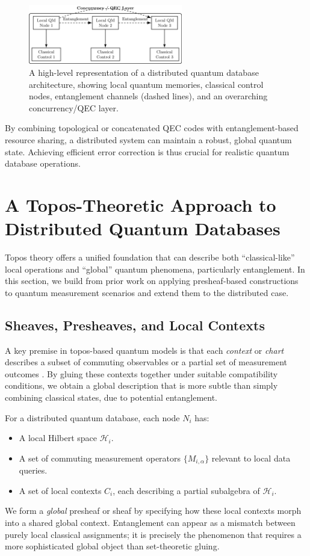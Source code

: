 \documentclass[11pt]{article}
\begin{document}
\begin{figure}[H]
    \centering
    \includegraphics[width=0.6\textwidth]{dist_qdb_arch_fig.png}
    \caption{A high-level representation of a distributed quantum database architecture, showing local quantum memories, classical control nodes, entanglement channels (dashed lines), and an overarching concurrency/QEC layer.}
    \label{fig:dqdb_architecture}
\end{figure}

By combining topological or concatenated QEC codes with entanglement-based resource sharing, a distributed system can maintain a robust, global quantum state. Achieving efficient error correction is thus crucial for realistic quantum database operations.

\section{A Topos-Theoretic Approach to Distributed Quantum Databases}
\label{sec:topos_theory}
Topos theory offers a unified foundation that can describe both “classical-like” local operations and “global” quantum phenomena, particularly entanglement. In this section, we build from prior work on applying presheaf-based constructions to quantum measurement scenarios and extend them to the distributed case.

\subsection{Sheaves, Presheaves, and Local Contexts}
A key premise in topos-based quantum models is that each \emph{context} or \emph{chart} describes a subset of commuting observables or a partial set of measurement outcomes \cite{isham_topos, doering_isham}. By gluing these contexts together under suitable compatibility conditions, we obtain a global description that is more subtle than simply combining classical states, due to potential entanglement.

For a distributed quantum database, each node $N_i$ has:
\begin{itemize}
    \item A local Hilbert space $\mathcal{H}_i$.
    \item A set of commuting measurement operators $\{M_{i,\alpha}\}$ relevant to local data queries.
    \item A set of local contexts $C_{i}$, each describing a partial subalgebra of $\mathcal{H}_i$.
\end{itemize}
We form a \emph{global} presheaf or sheaf by specifying how these local contexts morph into a shared global context. Entanglement can appear as a mismatch between purely local classical assignments; it is precisely the phenomenon that requires a more sophisticated global object than set-theoretic gluing.
\end{document}
